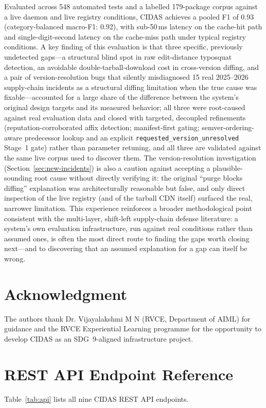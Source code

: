 \documentclass[journal]{IEEEtran}
\begin{document}
Evaluated across 548 automated tests and a labelled 179-package corpus against a live daemon and live
registry conditions, CIDAS achieves a pooled F1 of 0.93 (category-balanced macro-F1: 0.92), with sub-50\,ms
latency on the cache-hit path and
single-digit-second latency on the cache-miss path under typical registry conditions. A key finding of this
evaluation is that three specific, previously undetected gaps---a structural blind spot in raw edit-distance
typosquat detection, an avoidable double-tarball-download cost in cross-version diffing, and a pair of
version-resolution bugs that silently misdiagnosed 15 real 2025--2026 supply-chain incidents as a structural
diffing limitation when the true cause was fixable---accounted for a large share of the difference between
the system's original design targets and its measured behavior; all three were root-caused against real
evaluation data and closed with targeted, decoupled refinements (reputation-corroborated affix detection;
manifest-first gating; semver-ordering-aware predecessor lookup and an explicit
\texttt{requested\_version\_unresolved} Stage~1 gate) rather than parameter retuning, and all three are
validated against the same live corpus used to discover them. The version-resolution investigation
(Section~\ref{sec:new-incidents}) is also a caution against accepting a plausible-sounding root cause without
directly verifying it: the original ``purge blocks diffing'' explanation was architecturally reasonable but
false, and only direct inspection of the live registry (and of the tarball CDN itself) surfaced the real,
narrower limitation. This experience reinforces a broader methodological point consistent with the
multi-layer, shift-left supply-chain defense literature: a system's own evaluation infrastructure, run
against real conditions rather than assumed ones, is often the most direct route to finding the gaps worth
closing next---and to discovering that an assumed explanation for a gap can itself be wrong.

\section*{Acknowledgment}
The authors thank Dr. Vijayalakshmi M N (RVCE, Department of AIML) for guidance and the RVCE Experiential
Learning programme for the opportunity to develop CIDAS as an SDG~9-aligned infrastructure project.

\appendices

\section{REST API Endpoint Reference}
Table~\ref{tab:api} lists all nine CIDAS REST API endpoints.
\end{document}
